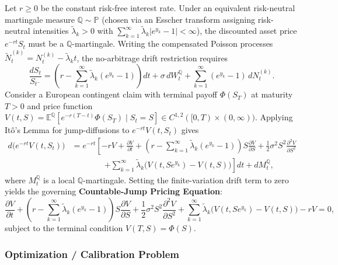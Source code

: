 \documentclass[11pt, letterpaper]{article}
\theoremstyle{definition}
\theoremstyle{remark}
\begin{document}
Let $r \ge 0$ be the constant risk-free interest rate. Under an equivalent risk-neutral martingale measure $\mathbb{Q} \sim \mathbb{P}$ (chosen via an Esscher transform assigning risk-neutral intensities $\tilde{\lambda}_k > 0$ with $\sum_{k=1}^{\infty} \tilde{\lambda}_k |e^{y_k} - 1| < \infty$), the discounted asset price $e^{-rt} S_t$ must be a $\mathbb{Q}$-martingale. Writing the compensated Poisson processes $\tilde{N}_t^{(k)} = N_t^{(k)} - \tilde{\lambda}_k t$, the no-arbitrage drift restriction requires
\[
\frac{dS_t}{S_{t^-}} = \left(r - \sum_{k=1}^{\infty} \tilde{\lambda}_k (e^{y_k} - 1)\right) dt + \sigma\, dW_t^{\mathbb{Q}} + \sum_{k=1}^{\infty} (e^{y_k} - 1)\, dN_t^{(k)}.
\]
Consider a European contingent claim with terminal payoff $\Phi(S_T)$ at maturity $T > 0$ and price function $V(t, S) = \mathbb{E}^{\mathbb{Q}}\!\left[e^{-r(T-t)}\Phi(S_T) \mid S_t = S\right] \in C^{1,2}([0, T) \times (0, \infty))$. Applying It\^o's Lemma for jump-diffusions to $e^{-rt} V(t, S_t)$ gives
\begin{align*}
d\bigl(e^{-rt} V(t, S_t)\bigr)
&= e^{-rt} \left[ -rV + \frac{\partial V}{\partial t} + \left(r - \sum_{k=1}^{\infty} \tilde{\lambda}_k (e^{y_k} - 1)\right) S \frac{\partial V}{\partial S} + \frac{1}{2}\sigma^2 S^2 \frac{\partial^2 V}{\partial S^2} \right. \\
&\qquad\qquad \left. + \sum_{k=1}^{\infty} \tilde{\lambda}_k \bigl(V(t, S e^{y_k}) - V(t, S)\bigr) \right] dt + dM_t^{\mathbb{Q}},
\end{align*}
where $M_t^{\mathbb{Q}}$ is a local $\mathbb{Q}$-martingale. Setting the finite-variation drift term to zero yields the governing \textbf{Countable-Jump Pricing Equation}:
\[
\frac{\partial V}{\partial t} + \left(r - \sum_{k=1}^{\infty} \tilde{\lambda}_k (e^{y_k} - 1)\right) S \frac{\partial V}{\partial S} + \frac{1}{2}\sigma^2 S^2 \frac{\partial^2 V}{\partial S^2} + \sum_{k=1}^{\infty} \tilde{\lambda}_k \bigl(V(t, S e^{y_k}) - V(t, S)\bigr) - rV = 0,
\]
subject to the terminal condition $V(T, S) = \Phi(S)$.

\subsubsection{Optimization / Calibration Problem}
\end{document}
